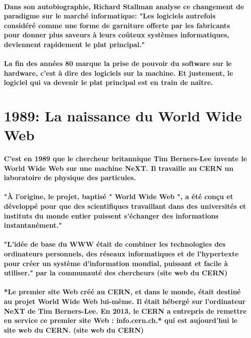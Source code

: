 \paragraph{
  Dans son autobiographie, Richard Stallman analyse ce changement de paradigme sur le marché informatique: "Les logiciels autrefois considéré comme une forme de garniture offerte par les fabricants pour donner plus saveurs à leurs coûteux systèmes informatiques, deviennent rapidement le plat principal."
}

\paragraph{
  La fin des années 80 marque la prise de pouvoir du software sur le hardware, c'est à dire des logiciels sur la machine. Et justement, le logiciel qui va devenir le plat principal est en train de naître.
}

\section*{1989: La naissance du World Wide Web}

\paragraph{
  C'est en 1989 que le chercheur britannique Tim Berners-Lee invente le World Wide Web sur une machine NeXT. Il travaille au CERN un laboratoire de physique des particules.
}

\paragraph{
  "À l’origine, le projet, baptisé " World Wide Web ", a été conçu et développé pour que des scientifiques travaillant dans des universités et instituts du monde entier puissent s'échanger des informations instantanément."
}

\paragraph{
  "L'idée de base du WWW était de combiner les technologies des ordinateurs personnels, des réseaux informatiques et de l'hypertexte pour créer un système d'information mondial, puissant et facile à utiliser." par la communauté des chercheurs (site web du CERN)
}

\paragraph{
  *Le premier site Web créé au CERN, et dans le monde, était destiné au projet World Wide Web lui-même. Il était hébergé sur l’ordinateur NeXT de Tim Berners-Lee. En 2013, le CERN a entrepris de remettre en service ce premier site Web : info.cern.ch.* qui est aujourd'hui le site web du CERN. (site web du CERN)
}

